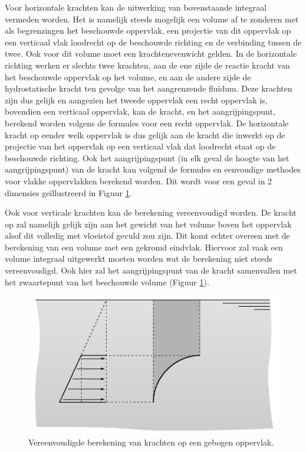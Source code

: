 Voor horizontale krachten kan de uitwerking van bovenstaande integraal vermeden worden. Het is namelijk steeds mogelijk een volume af te zonderen met als begrenzingen het beschouwde oppervlak, een projectie van dit oppervlak op een verticaal vlak loodrecht op de beschouwde richting en de verbinding tussen de twee. Ook voor dit volume moet een krachtenevenwicht gelden. In de horizontale richting werken er slechts twee krachten, aan de ene zijde de reactie kracht van het beschouwde oppervlak op het volume, en aan de andere zijde de hydrostatische kracht ten gevolge van het aangrenzende fluïdum. Deze krachten zijn dus gelijk en aangezien het tweede oppervlak een recht oppervlak is, bovendien een verticaal oppervlak, kan de kracht, en het aangrijpingspunt, berekend worden volgens de formules voor een recht oppervlak. De horizontale kracht op eender welk oppervlak is dus gelijk aan de kracht die inwerkt op de projectie van het oppervlak op een verticaal vlak dat loodrecht staat op de beschouwde richting. Ook het aangrijpingspunt (in elk geval de hoogte van het aangrijpingspunt) van de kracht kan volgend de formules en eenvoudige methodes voor vlakke oppervlakken berekend worden. Dit wordt voor een geval in 2 dimensies geïllustreerd in Figuur \ref{fig:kracht_gebogen_oppervlak_vereenvoudigd_2d}.

Ook voor verticale krachten kan de berekening vereenvoudigd worden. De kracht op zal namelijk gelijk zijn aan het gewicht van het volume boven het oppervlak alsof dit volledig met vloeistof gevuld zou zijn. Dit komt echter overeen met de berekening van een volume met een gekromd eindvlak. Hiervoor zal vaak een volume integraal uitgewerkt moeten worden wat de berekening niet steeds vereenvoudigd. Ook hier zal het aangrijpingspunt van de kracht samenvallen met het zwaartepunt van het beschouwde volume (Figuur \ref{fig:kracht_gebogen_oppervlak_vereenvoudigd_2d}).
\begin{figure}[htb]
	\centering
	\includegraphics{fig/hydrostatica/kracht_gebogen_oppervlak_vereenvoudigd_2d}
	\caption{Vereenvoudigde berekening van krachten op een gebogen oppervlak.}
	\label{fig:kracht_gebogen_oppervlak_vereenvoudigd_2d}
\end{figure}

